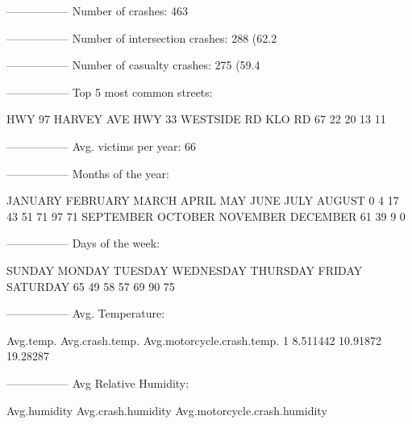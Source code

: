 \documentclass[11pt, a4paper]{article}
\begin{document}
\begin{Schunk}
\begin{Soutput}
-----------------
Number of crashes: 463
\end{Soutput}
\begin{Soutput}
-----------------
Number of intersection crashes: 288 (62.2%
\end{Soutput}
\begin{Soutput}
-----------------
Number of casualty crashes: 275 (59.4%
\end{Soutput}
\begin{Soutput}
-----------------
Top 5 most common streets:
\end{Soutput}
\begin{Soutput}
     HWY 97  HARVEY AVE      HWY 33 WESTSIDE RD      KLO RD 
         67          22          20          13          11 
\end{Soutput}
\begin{Soutput}
-----------------
Avg. victims per year: 66
\end{Soutput}
\begin{Soutput}
-----------------
Months of the year:
\end{Soutput}
\begin{Soutput}
  JANUARY  FEBRUARY     MARCH     APRIL       MAY      JUNE      JULY    AUGUST 
        0         4        17        43        51        71        97        71 
SEPTEMBER   OCTOBER  NOVEMBER  DECEMBER 
       61        39         9         0 
\end{Soutput}
\begin{Soutput}
-----------------
Days of the week:
\end{Soutput}
\begin{Soutput}
   SUNDAY    MONDAY   TUESDAY WEDNESDAY  THURSDAY    FRIDAY  SATURDAY 
       65        49        58        57        69        90        75 
\end{Soutput}
\begin{Soutput}
-----------------
Avg. Temperature:
\end{Soutput}
\begin{Soutput}
  Avg.temp. Avg.crash.temp. Avg.motorcycle.crash.temp.
1  8.511442        10.91872                   19.28287
\end{Soutput}
\begin{Soutput}
-----------------
Avg Relative Humidity:
\end{Soutput}
\begin{Soutput}
  Avg.humidity Avg.crash.humidity Avg.motorcycle.crash.humidity

\end{Soutput}
\end{Schunk}
\end{document}
